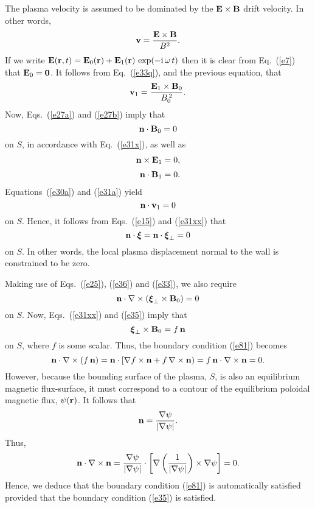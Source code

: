 \documentclass[12pt,prb,aps,notitlepage]{revtex4-1}
\newcommand{\bxi}{\mbox{\boldmath$\xi$}}
\begin{document}
The plasma velocity is assumed to be dominated by the ${\bf E}\times {\bf B}$ drift velocity. In other words,
\begin{equation}
{\bf v} = \frac{{\bf E}\times {\bf B}}{B^2}.
\end{equation}
If we write ${\bf E}({\bf r},t)= {\bf E}_0({\bf r})+ {\bf E}_1({\bf r})\,\exp(-{\rm i}\,\omega\,t)$
then it is clear from Eq.~(\ref{e7}) that ${\bf E}_0={\bf 0}$. It follows from Eq.~(\ref{e33q}), and the previous equation, that
\begin{equation}\label{e30a}
{\bf v}_1 = \frac{{\bf E}_1\times {\bf B}_0}{B_0^{\,2}}.
\end{equation}
Now, Eqs.~(\ref{e27a}) and (\ref{e27b}) imply that
\begin{equation}\label{e31xx}
{\bf n} \cdot {\bf B}_0=0
\end{equation}
on $S$, 
in accordance with Eq.~(\ref{e31x}), 
as well as 
\begin{align}
{\bf n}\times {\bf E}_1&= 0,\label{e31a}\\[0.5ex]
{\bf n} \cdot {\bf B}_1&=0.\label{e33}
\end{align}
Equations~(\ref{e30a}) and (\ref{e31a}) yield
\begin{equation}
{\bf n}\cdot{\bf v}_1=0
\end{equation}
on $S$. Hence, it follows from Eqs.~(\ref{e15}) and (\ref{e31xx}) that
\begin{equation}\label{e35}
{\bf n}\cdot\bxi = {\bf n}\cdot\bxi_\perp = 0
\end{equation}
on $S$. In other words, the local plasma displacement normal to the wall is constrained to be zero. 

 Making use of Eqs.~(\ref{e25}), (\ref{e36}) and (\ref{e33}),
we also require 
\begin{equation}\label{e81}
{\bf n}\cdot\nabla\times(\bxi_\perp\times {\bf B}_0) = 0
\end{equation}
on $S$. Now, Eqs.~(\ref{e31xx}) and (\ref{e35})  imply that
\begin{equation}
\bxi_\perp\times {\bf B}_0= f\,{\bf n}
\end{equation}
on $S$, where $f$ is some scalar.
Thus, the boundary condition (\ref{e81}) becomes
\begin{equation}
{\bf n}\cdot \nabla\times (f\,{\bf n}) = {\bf n}\cdot[\nabla f\times {\bf n} + f\,\nabla\times {\bf n})= f\,{\bf n}\cdot\nabla\times {\bf n} = 0.
\end{equation}
However, because the bounding surface of the plasma, $S$, is also an equilibrium magnetic flux-surface, it must correspond to a contour of the equilibrium poloidal
magnetic flux,  $\psi({\bf r})$. 
It follows that
\begin{equation}
{\bf n} = \frac{\nabla\psi}{|\nabla\psi|}.
\end{equation}
Thus,
\begin{equation}\label{e98p}
{\bf n}\cdot\nabla\times {\bf n} = \frac{\nabla\psi}{|\nabla\psi|}\cdot \left[\nabla\left(\frac{1}{|\nabla\psi|}\right)\times \nabla\psi\right]=0.
\end{equation}
Hence, we deduce that the boundary condition (\ref{e81}) is automatically satisfied provided that the boundary condition (\ref{e35}) is satisfied. 
\end{document}
